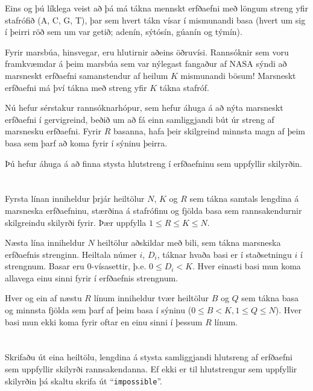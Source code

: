 \ifx\boi\undefined\fi
\def\version{jury-1}
Eins og þú líklega veist að þá má tákna mennskt erfðaefni með löngum streng yfir
stafrófið ({A, C, G, T}), þar sem hvert tákn vísar í mismunandi basa 
(hvert um sig í þeirri röð sem um var getið; adenín, sýtósín, gúanín og týmín).

Fyrir marsbúa, hinsvegar, eru hlutirnir aðeins öðruvísi. Rannsóknir sem voru
framkvæmdar á þeim marsbúa sem var nýlegast fangaður af NASA sýndi að marsneskt erfðaefni
samanstendur af heilum $K$ mismunandi bösum! Marsneskt erfðaefni má því tákna með streng
yfir $K$ tákna stafróf.

Nú hefur sérstakur rannsóknarhópur, sem hefur áhuga á að nýta marsneskt erfðaefni í 
gervigreind, beðið um að fá einn samliggjandi bút úr streng af marsnesku erfðaefni.
Fyrir $R$ basanna, hafa þeir skilgreind minnsta magn af þeim basa sem þarf að
koma fyrir í sýninu þeirra.

Þú hefur áhuga á að finna stysta hlutstreng í erfðaefninu sem uppfyllir skilyrðin.

\section*{}
Fyrsta línan inniheldur þrjár heiltölur $N$, $K$ og $R$ sem tákna samtals
lengdina á marsneska erfðaefninu, stærðina á stafrófinu og fjölda basa sem
rannsakendurnir skilgreindu skilyrði fyrir. Þær uppfylla $1 \le R \le K \le N$.

Næsta lína inniheldur $N$ heiltölur aðskildar með bili, sem tákna marsneska
erfðaefnis strenginn. Heiltala númer $i$, $D_i$, táknar hvaða basi er í staðsetningu
$i$ í strengnum. Basar eru $0$-vísasettir, þ.e. $0 \leq D_i < K$. Hver einasti 
basi mun koma allavega einu sinni fyrir í erfðaefnis strengnum.

Hver og ein af næstu $R$ línum inniheldur tvær heiltölur $B$ og $Q$ sem tákna basa
og minnsta fjölda sem þarf af þeim basa í sýninu ($0 \le B < K, 1 \leq Q \le N$).
Hver basi mun ekki koma fyrir oftar en einu sinni í þessum $R$ línum.

\section*{\outputsection}
Skrifaðu út eina heiltölu, lengdina á stysta samliggjandi hlutsreng af erfðaefni
sem uppfyllir skilyrði rannsakendanna. Ef ekki er til hlutstrengur sem uppfyllir
skilyrðin þá skaltu skrifa út ``\texttt{impossible}''.

